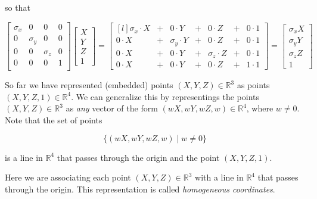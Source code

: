\documentclass{article}
\theoremstyle{definition}
\begin{document}
\bigskip
\noindent
so that 

\begin{equation*}
\begin{bmatrix}  \sigma_x & 0 & 0 & 0 \\ 
                          0 & \sigma_y& 0 & 0 \\ 
                          0 & 0 & \sigma_z & 0 \\
                          0 & 0 & 0 & 1     \\
\end{bmatrix} 
\begin{bmatrix} X \\ Y \\ Z \\ 1 \end{bmatrix} =
\begin{bmatrix*}[l]
\sigma_x  \cdot X  &+&  0             \cdot Y    &+& 0 \cdot Z                &+& 0 \cdot 1 \\
0 \cdot X               &+&  \sigma_y \cdot Y    &+& 0 \cdot Z                &+& 0 \cdot 1 \\
0 \cdot X               &+& 0               \cdot Y    &+& \sigma_z \cdot Z   &+& 0 \cdot 1 \\
0 \cdot X              &+& 0                \cdot Y    &+& 0 \cdot Z               &+& 1 \cdot 1
\end{bmatrix*} =
\begin{bmatrix} \sigma_x X \\ \sigma_y Y \\ \sigma_z Z \\ 1 \end{bmatrix} 
\end{equation*}

\bigskip
\noindent
So far we have represented (embedded) points $(X, Y, Z) \in \mathbb{R}^3$ as points $(X, Y, Z, 1) \in \mathbb{R}^4$. We can generalize this by representings
the points $(X, Y, Z) \in \mathbb{R}^3$ as \emph{any} vector of the form $(wX, wY, wZ, w) \in \mathbb{R}^4$, where $w \neq 0$. Note that the set of points

\bigskip
\begin{equation*}
\big \{(wX,wY,wZ,w) \mid w \neq 0\big \}
\end{equation*}

\bigskip
\noindent
is a line in $\mathbb{R}^4$  that passes through the origin and the point $(X,Y,Z,1)$. 

\bigskip
\noindent
Here we are associating each point  $(X,Y,Z) \in \mathbb{R}^3$ with a line in $\mathbb{R}^4$ that passes through the origin. 
This representation is called \emph{homogeneous coordinates}.
\end{document}
